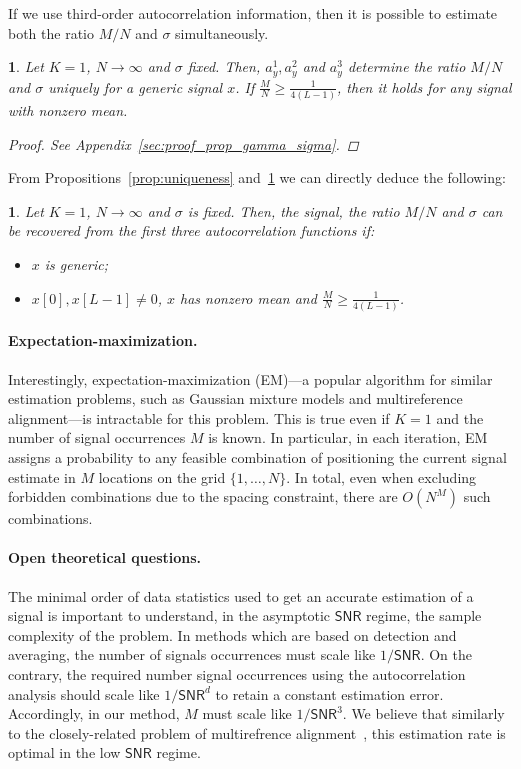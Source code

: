 \documentclass[english,11pt]{article}
\numberwithin{equation}{section}
\theoremstyle{plain}
\theoremstyle{definition}
\theoremstyle{remark}
\theoremstyle{plain}
\theoremstyle{remark}
\theoremstyle{plain}
\newtheorem{corollary}[thm]{\protect\corollaryname}
\theoremstyle{plain}
\newtheorem{proposition}[thm]{\protect\propositionname}
\providecommand{\corollaryname}{Corollary}
\providecommand{\propositionname}{Proposition}
\newcommand{\SNR}{{\textsf{SNR}}}
\begin{document}
If we use third-order autocorrelation information, then it is possible to estimate both the ratio $M/N$ and $\sigma$ simultaneously.
\begin{proposition} \label{prop:gamma_sigma}
	Let $K=1$, $N\to\infty$ and $\sigma$ fixed. Then, $a_y^1,a_y^2$ and  $a_y^3$ determine the ratio $M/N$ and $\sigma$ uniquely for a generic signal $x$. If $\frac{M}{N}\geq\frac{1}{4(L-1)}$, then it holds for any signal with nonzero mean. 
	\begin{proof}
		See Appendix~\ref{sec:proof_prop_gamma_sigma}.
	\end{proof}
\end{proposition}

From Propositions~\ref{prop:uniqueness} and~\ref{prop:gamma_sigma} we can directly deduce the following:
\begin{corollary}
	Let $K=1$, $N\to\infty$ and $\sigma$ is fixed. Then, the signal, the ratio $M/N$ and $\sigma$ can be recovered from the first three autocorrelation functions if:
	\begin{itemize}
		\item $x$ is generic;
		\item  $x[0],x[L-1]\neq 0$, $x$ has nonzero mean and $\frac{M}{N}\geq\frac{1}{4(L-1)}$.
	\end{itemize}
\end{corollary}

\paragraph{Expectation-maximization.}
Interestingly, expectation-maximization (EM)---a popular algorithm for similar estimation problems, such as Gaussian mixture models and multireference alignment---is intractable for this problem. This is true even if  $K=1$ and the number of signal occurrences $M$ is known.
In particular, in each iteration, EM assigns a probability to any feasible combination of positioning the current signal estimate in $M$ locations on the grid $\{1,\ldots,N\}$.
In total, even when excluding forbidden combinations due to the spacing constraint, there are $O(N^M)$ such combinations.


\paragraph{Open theoretical questions.}


The minimal order of data statistics used to get an accurate estimation of a signal is important to understand, in the asymptotic $\SNR$ regime, the sample complexity of the problem.
In methods which are based on detection and averaging, the number of signals occurrences  must scale like $1/\SNR$. On the contrary, the required number signal occurrences using the autocorrelation analysis should scale like $1/\SNR^d$  to retain a constant estimation error. Accordingly, in our  method, $M$ must scale like $1/\SNR^3$. We believe that similarly to the closely-related problem of multirefrence alignment~\cite{perry2017sample,abbe2017multireference}, this estimation rate is optimal in the low $\SNR$ regime.
\end{document}
